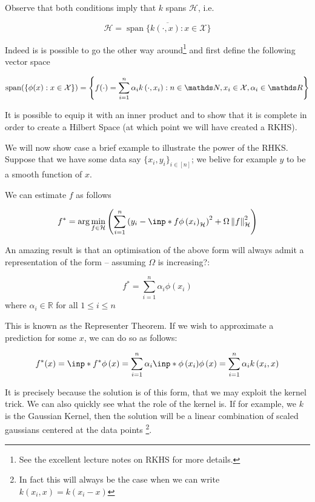 Observe that both conditions imply that $k$ spans $\mathcal{H}$, i.e.

\begin{equation}
    \mathcal{H}=\overline{\operatorname{span}\{k(\cdot, x): x \in \mathcal{X}\}}
\end{equation}

Indeed is is possible to go the other way around\footnote{See the excellent lecture notes on 
RKHS \cite{BartlettNotes} for more details.} and first define the following vector space

\begin{equation}
    \operatorname{span}(\{\phi(x): x \in \mathcal{X}\})=\left\{f(\cdot)=
    \sum_{i=1}^{n} \alpha_{i} k\left(\cdot, x_{i}\right): n \in \N, x_{i} 
    \in \mathcal{X}, \alpha_{i} \in \R\right\}
\end{equation}

It is possible to equip it with an inner product and to show that it is complete in order to create
a Hilbert Space (at which point we will have created a RKHS).

We will now show case a brief example to illustrate the power of the RHKS. Suppose that we have 
some data say $\{ x_i, y_i\}_{i \in [n]}$; we belive for example $y$ to be a smooth function of $x$.

We can estimate $f$ as follows

\begin{equation}
    f^{*}=\arg \min _{f \in \mathcal{H}}\left(
        \sum_{i=1}^{n} 
        \left(y_{i} - \inp*{f}{\phi\left(x_{i}\right)}_{\mathcal{H}} \right)^{2}
        + \Omega \norm{f}_{\mathcal{H}}^{2}\right)
\end{equation}

An amazing result is that an optimisation of the above form will always admit a representation of the
form -- assuming $\Omega$ is increasing?:

\[
    f^{*} = \sum_{i=1}^{n} \alpha_{i} \phi\left(x_{i}\right)
\]
where $\alpha_{i} \in \mathbb{R}$ for all $1 \leq i \leq n$

This is known as the Representer Theorem. If we wish to approximate a prediction for some $x$,
we can do so as follows:


$$
    f^{*}(x) = \inp*{f^{*}}{\phi\left(x\right)} = 
    \sum_{i=1}^{n} \alpha_{i} \inp*{\phi\left(x_i\right)}{\phi\left(x\right)} =
    \sum_{i=1}^{n} \alpha_{i} k\left(x_i, x\right)
$$

It is precisely because the solution is of this form, that we may exploit the kernel trick. We can
also quickly see what the role of the kernel is. If for example, we $k$ is the Gaussian Kernel, then
the solution will be a linear combination of scaled gaussians centered at the data points
\footnote{In fact this will always be the case when we can write $k\left(x_i, x\right) = k\left(x_i - x\right)$}. 

